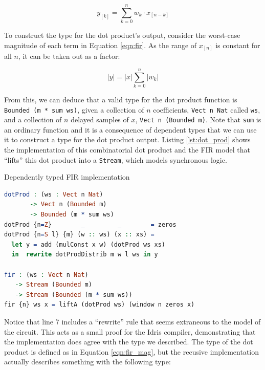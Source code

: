 \documentclass[conference]{IEEEtran}
\begin{document}
\begin{equation}
  y_{[k]} = \sum_{k=0}^{n} w_k \cdot x_{[n-k]}
\label{eqn:fir}
\end{equation}

To construct the type for the dot product's output, consider the worst-case
magnitude of each term in Equation \ref{eqn:fir}. As the range of $x_{[n]}$ is
constant for all $n$, it can be taken out as a factor:

\begin{equation}
  |y| = |x|\sum_{k=0}^{n} |w_k|
\label{eqn:fir_mag}
\end{equation}


From this, we can deduce that a valid type for the dot product function is
\texttt{Bounded (m * sum ws)}, given a collection of $n$ coefficients,
\texttt{Vect n Nat} called \texttt{ws}, and a collection of $n$ delayed samples
of $x$, \texttt{Vect n (Bounded m)}. Note that \texttt{sum} is an ordinary
function and it is a consequence of dependent types that we can use it to
construct a type for the dot product output. Listing \ref{lst:dot_prod} shows
the implementation of this combinatorial dot product and the FIR model that
``lifts'' this dot product into a \texttt{Stream}, which models synchronous
logic.

\begin{codefig}[h]
  \caption{Dependently typed FIR implementation}
\begin{lstlisting}[language=idris]
dotProd : (ws : Vect n Nat)
       -> Vect n (Bounded m)
       -> Bounded (m * sum ws)
dotProd {n=Z}        _         _        = zeros
dotProd {n=S l} {m} (w :: ws) (x :: xs) =
  let y = add (mulConst x w) (dotProd ws xs)
  in  rewrite dotProdDistrib m w l ws in y

fir : (ws : Vect n Nat)
   -> Stream (Bounded m)
   -> Stream (Bounded (m * sum ws))
fir {n} ws x = liftA (dotProd ws) (window n zeros x)
\end{lstlisting}
\label{lst:dot_prod}
\end{codefig}

Notice that line 7 includes a ``rewrite'' rule that seems extraneous to the
model of the circuit. This acts as a small proof for the Idris compiler,
demonstrating that the implementation does agree with the type we described. The
type of the dot product is defined as in Equation \ref{eqn:fir_mag}, but the
recusive implementation actually describes something with the following type:
\end{document}
